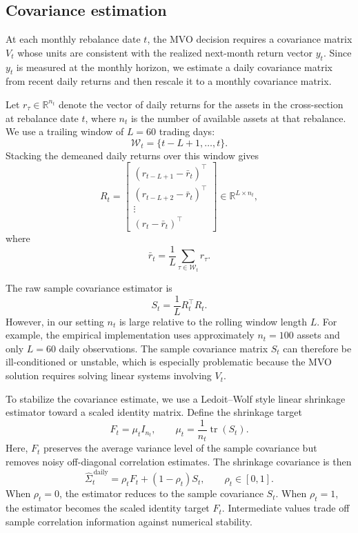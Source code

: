 \documentclass{article}
\begin{document}
\subsection{Covariance estimation}

At each monthly rebalance date \(t\), the MVO decision requires a covariance
matrix \(V_t\) whose units are consistent with the realized next-month return
vector \(y_t\). Since \(y_t\) is measured at the monthly horizon, we estimate a
daily covariance matrix from recent daily returns and then rescale it to a
monthly covariance matrix.

Let \(r_{\tau}\in \mathbb R^{n_t}\) denote the vector of daily returns for the
assets in the cross-section at rebalance date \(t\), where \(n_t\) is the
number of available assets at that rebalance. We use a trailing window of
\(L=60\) trading days:
\[
\mathcal W_t = \{t-L+1,\ldots,t\}.
\]
Stacking the demeaned daily returns over this window gives
\[
R_t =
\begin{bmatrix}
(r_{t-L+1}-\bar r_t)^\top \\
(r_{t-L+2}-\bar r_t)^\top \\
\vdots \\
(r_t-\bar r_t)^\top
\end{bmatrix}
\in \mathbb R^{L\times n_t},
\]
where
\[
\bar r_t = \frac{1}{L}\sum_{\tau\in \mathcal W_t} r_\tau.
\]

The raw sample covariance estimator is
\[
S_t
=
\frac{1}{L}R_t^\top R_t.
\]
However, in our setting \(n_t\) is large relative to the rolling window length
\(L\). For example, the empirical implementation uses approximately \(n_t=100\)
assets and only \(L=60\) daily observations. The sample covariance matrix
\(S_t\) can therefore be ill-conditioned or unstable, which is especially
problematic because the MVO solution requires solving linear systems involving
\(V_t\).

To stabilize the covariance estimate, we use a Ledoit--Wolf style linear
shrinkage estimator toward a scaled identity matrix. Define the shrinkage
target
\[
F_t = \mu_t I_{n_t},
\qquad
\mu_t = \frac{1}{n_t}\operatorname{tr}(S_t).
\]
Here, \(F_t\) preserves the average variance level of the sample covariance but
removes noisy off-diagonal correlation estimates. The shrinkage covariance is
then
\[
\widehat{\Sigma}^{\,\mathrm{daily}}_t
=
\rho_t F_t + (1-\rho_t)S_t,
\qquad
\rho_t\in[0,1].
\]
When \(\rho_t=0\), the estimator reduces to the sample covariance \(S_t\).
When \(\rho_t=1\), the estimator becomes the scaled identity target \(F_t\).
Intermediate values trade off sample correlation information against numerical
stability.
\end{document}
